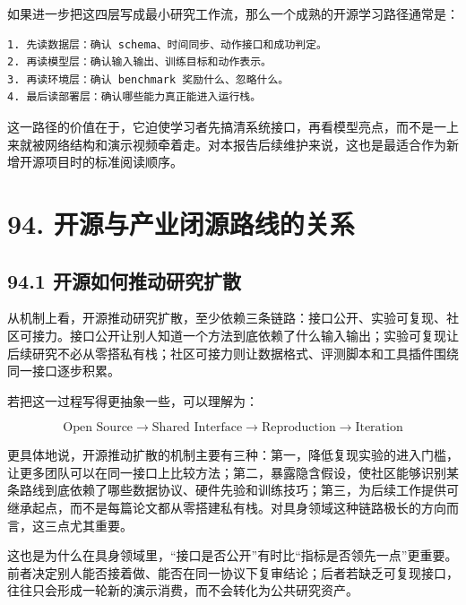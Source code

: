 如果进一步把这四层写成最小研究工作流，那么一个成熟的开源学习路径通常是：

\begin{lstlisting}
1. 先读数据层：确认 schema、时间同步、动作接口和成功判定。
2. 再读模型层：确认输入输出、训练目标和动作表示。
3. 再读环境层：确认 benchmark 奖励什么、忽略什么。
4. 最后读部署层：确认哪些能力真正能进入运行栈。
\end{lstlisting}

这一路径的价值在于，它迫使学习者先搞清系统接口，再看模型亮点，而不是一上来就被网络结构和演示视频牵着走。对本报告后续维护来说，这也是最适合作为新增开源项目时的标准阅读顺序。

\section*{94. 开源与产业闭源路线的关系}

\subsection*{94.1 开源如何推动研究扩散}


从机制上看，开源推动研究扩散，至少依赖三条链路：接口公开、实验可复现、社区可接力。接口公开让别人知道一个方法到底依赖了什么输入输出；实验可复现让后续研究不必从零搭私有栈；社区可接力则让数据格式、评测脚本和工具插件围绕同一接口逐步积累。

若把这一过程写得更抽象一些，可以理解为：

\begingroup
\scriptsize
\begin{equation*}
\text{Open Source} \rightarrow \text{Shared Interface} \rightarrow \text{Reproduction} \rightarrow \text{Iteration}
\end{equation*}
\endgroup

更具体地说，开源推动扩散的机制主要有三种：第一，降低复现实验的进入门槛，让更多团队可以在同一接口上比较方法；第二，暴露隐含假设，使社区能够识别某条路线到底依赖了哪些数据协议、硬件先验和训练技巧；第三，为后续工作提供可继承起点，而不是每篇论文都从零搭建私有栈。对具身领域这种链路极长的方向而言，这三点尤其重要。

这也是为什么在具身领域里，“接口是否公开”有时比“指标是否领先一点”更重要。前者决定别人能否接着做、能否在同一协议下复审结论；后者若缺乏可复现接口，往往只会形成一轮新的演示消费，而不会转化为公共研究资产。

